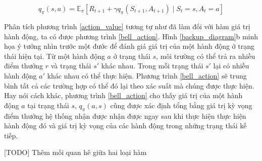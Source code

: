 	\begin{equation}
		\label{bell_action}
		q_{\pi}(s,a) = \mathbb{E}_{\pi} \left[\mathit{R}_{t+1} + \gamma q_{\pi}(\mathit{S}_{t+1}, \mathit{A}_{t+1}) \mid \mathit{S}_t = s, \mathit{A}_t = a \right]
	\end{equation}
	
	Phân tích phương trình \ref{action_value} tương tự như đã làm đối với hàm giá trị hành động, ta có được phương trình \ref{bell_action}. Hình \ref{backup_diagram}b minh họa ý tưởng nhìn trước một đước để đánh giá giá trị của một hành động ở trạng thái hiện tại. Từ một hành động $a$ ở trạng thái $s$, môi trường có thể trả ra nhiều điểm thưởng $r$ và trạng thái $s'$ khác nhau. Trong mỗi trạng thái $s'$ lại có nhiều hành động $a'$ khác nhau có thể thực hiện.	Phương trình \ref{bell_action} sẽ trung bình tất cả các trường hợp có thể đó lại theo xác suất mà chúng được thực hiện. Hay nói cách khác, phương trình \ref{bell_action} cho thấy giá trị của một hành động $a$ tại trạng thái $s$, $q_{\pi}(a,s)$ cũng được xác định tổng bằng giá trị kỳ vọng điểm thưởng hệ thống nhận được nhận được ngay sau khi thực hiện thực hiện hành động đó và giá trị kỳ vọng của các hành động trong những trạng thái kế tiếp.
	
	[TODO] Thêm mối quan hê giữa hai loại hàm
	
